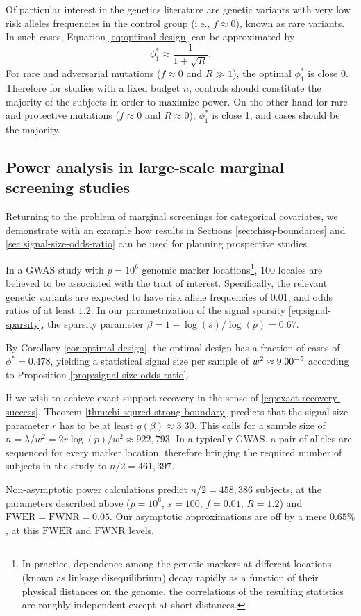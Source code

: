 Of particular interest in the genetics literature are genetic variants with very low risk alleles frequencies in the control group (i.e., $f\approx 0$), known as rare variants.
In such cases, Equation \eqref{eq:optimal-design} can be approximated by
\begin{equation} \label{eq:optimal-design-approx}
    \phi_1^* \approx \frac{1}{1 + \sqrt{R}}.
\end{equation}
For rare and adversarial mutations ($f\approx0$ and $R\gg1$), the optimal $\phi_1^*$ is close 0. 
Therefore for studies with a fixed budget $n$, controls should constitute the majority of the subjects in order to maximize power.
On the other hand for rare and protective mutations ($f\approx0$ and $R\approx0$), $\phi_1^*$ is close 1, and cases should be the majority.

\subsection{Power analysis in large-scale marginal screening studies}

Returning to the problem of marginal screenings for categorical covariates, we demonstrate with an example how results in Sections \ref{sec:chisq-boundaries} and \ref{sec:signal-size-odds-ratio} can be used for planning prospective studies.

\begin{example}
In a GWAS study with $p = 10^6$ genomic marker locations\footnote{In practice, dependence among the genetic markers at different locations (known as linkage disequilibrium) decay rapidly as a function of their physical distances on the genome, the correlations of the resulting statistics are roughly independent except at short distances.}, 100 locales are believed to be associated with the trait of interest.
Specifically, the relevant genetic variants are expected to have risk allele frequencies of $0.01$, and odds ratios of at least $1.2$.
In our parametrization of the signal sparsity \eqref{eq:signal-sparsity}, the sparsity parameter $\beta = 1 - \log(s)/\log(p) = 0.67$.

By Corollary \ref{cor:optimal-design}, the optimal design has a fraction of cases of $\phi^* = 0.478$, yielding a statistical signal size per sample of $w^2\approx9.00\time10^{-5}$ according to Proposition \ref{prop:signal-size-odds-ratio}.

If we wish to achieve exact support recovery in the sense of \eqref{eq:exact-recovery-success}, Theorem \ref{thm:chi-squred-strong-boundary} predicts that the signal size parameter $r$ has to be at least $g(\beta) \approx 3.30$.
This calls for a sample size of $n = \lambda / w^2 = 2r\log(p)/w^2 \approx 922,793$.
In a typically GWAS, a pair of alleles are sequenced for every marker location, therefore bringing the required number of subjects in the study to $n / 2 = 461,397$.

Non-asymptotic power calculations \cite{gao2019upass} predict $n / 2 = 458,386$ subjects, at the parameters described above ($p=10^6$, $s=100$, $f=0.01$, $R=1.2$) and $\mathrm{FWER}=\mathrm{FWNR}=0.05$.
Our asymptotic approximations are off by a mere $0.65\%$, at this $\mathrm{FWER}$ and $\mathrm{FWNR}$ levels.
\end{example}
